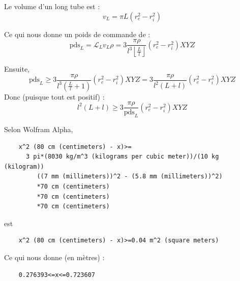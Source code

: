 \documentclass[11pt, a4paper]{article}
\begin{document}
  Le volume d'un long tube est :
  \begin{equation}
    v_L=\pi L\left( r_e^2 - r_i^2 \right)
  \end{equation}

  Ce qui nous donne un poids de commande de :
  \begin{equation}
    \text{pds}_L=\mathcal{L}_Lv_L\rho=3\frac{\pi\rho}{l^3\left\lfloor \frac{L}{l} \right\rfloor}\left( r_e^2 - r_i^2 \right)XYZ
  \end{equation}

  Ensuite,
  \begin{equation}
    \text{pds}_L \geq 3\frac{\pi\rho}{l^3\left(\frac{L}{l} + 1 \right)}\left( r_e^2 - r_i^2 \right)XYZ=3\frac{\pi\rho}{l^2\left(L + l \right)}\left( r_e^2 - r_i^2 \right)XYZ
  \end{equation}
  Donc (puisque tout est positif) :
  \begin{equation}
    l^2\left(L + l \right) \geq 3\frac{\pi\rho}{\text{pds}_L}\left( r_e^2 - r_i^2 \right)XYZ
  \end{equation}

  Selon Wolfram Alpha,
  \begin{verbatim}
    x^2 (80 cm (centimeters) - x)>=
      3 pi*(8030 kg/m^3 (kilograms per cubic meter))/(10 kg (kilogram))
         ((7 mm (millimeters))^2 - (5.8 mm (millimeters))^2)
         *70 cm (centimeters)
         *70 cm (centimeters)
         *70 cm (centimeters)
  \end{verbatim}
  est 
  \begin{verbatim}
    x^2 (80 cm (centimeters) - x)>=0.04 m^2 (square meters)
  \end{verbatim}
  Ce qui nous donne (en mètres) :
  \begin{verbatim}
    0.276393<=x<=0.723607
  \end{verbatim}
\end{document}
